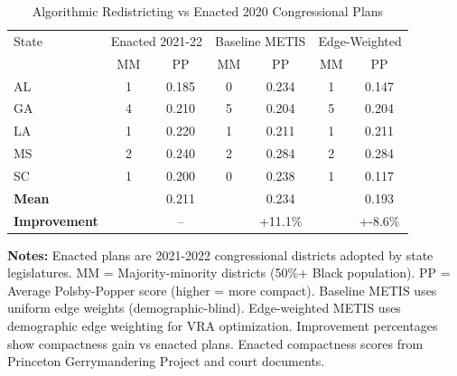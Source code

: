\begin{table}[h]
\centering
\caption{Algorithmic Redistricting vs Enacted 2020 Congressional Plans}
\label{tab:enacted_comparison}
\begin{tabular}{lcccccc}
\hline
State & \multicolumn{2}{c}{Enacted 2021-22} & \multicolumn{2}{c}{Baseline METIS} & \multicolumn{2}{c}{Edge-Weighted} \\
 & MM & PP & MM & PP & MM & PP \\
\hline
AL & 1 & 0.185 & 0 & 0.234 & 1 & 0.147 \\
GA & 4 & 0.210 & 5 & 0.204 & 5 & 0.204 \\
LA & 1 & 0.220 & 1 & 0.211 & 1 & 0.211 \\
MS & 2 & 0.240 & 2 & 0.284 & 2 & 0.284 \\
SC & 1 & 0.200 & 0 & 0.238 & 1 & 0.117 \\
\hline
\hline
\textbf{Mean} & & 0.211 & & 0.234 & & 0.193 \\
\textbf{Improvement} & & -- & & +11.1\% & & +-8.6\% \\
\hline
\end{tabular}
\vspace{0.2cm}
\begin{minipage}{0.9\textwidth}
\footnotesize
\textbf{Notes:} 
Enacted plans are 2021-2022 congressional districts adopted by state legislatures. 
MM = Majority-minority districts (50\%+ Black population). 
PP = Average Polsby-Popper score (higher = more compact). 
Baseline METIS uses uniform edge weights (demographic-blind). 
Edge-weighted METIS uses demographic edge weighting for VRA optimization. 
Improvement percentages show compactness gain vs enacted plans. 
Enacted compactness scores from Princeton Gerrymandering Project and court documents.
\end{minipage}
\end{table}